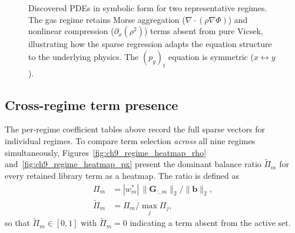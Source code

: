\begin{figure}[ht]
\centering
{}
\caption{Discovered PDEs in symbolic form for two representative regimes.
The gas regime retains Morse
aggregation ($\nabla\!\cdot\!(\rho\nabla\Phi)$) and nonlinear
compression ($\partial_x(\rho^2)$) terms absent from pure Vicsek,
illustrating how the sparse regression adapts the equation structure to the
underlying physics.  The $(p_y)_t$ equation is symmetric
($x\leftrightarrow y$).}
\label{fig:ch9_symbolic_pde}
\end{figure}

\subsection{Cross-regime term presence}

The per-regime coefficient tables above record the full sparse vectors for
individual regimes.  To compare term selection \emph{across} all nine regimes
simultaneously, Figures~\ref{fig:ch9_regime_heatmap_rho}
and~\ref{fig:ch9_regime_heatmap_px} present the dominant balance ratio
$\tilde{\Pi}_m$ for every retained library term as a heatmap.
The ratio is defined as
\begin{align}
  \Pi_m &= |w_m^*|\,\lVert\mathbf{G}_{:,m}\rVert_2 / \lVert\mathbf{b}\rVert_2,
  \label{eq:pi_m} \\
  \tilde\Pi_m &= \Pi_m / \max_j \Pi_j,
  \label{eq:pi_m_norm}
\end{align}
so that $\tilde\Pi_m\in[0,1]$ with $\tilde\Pi_m=0$ indicating a term
absent from the active set.

